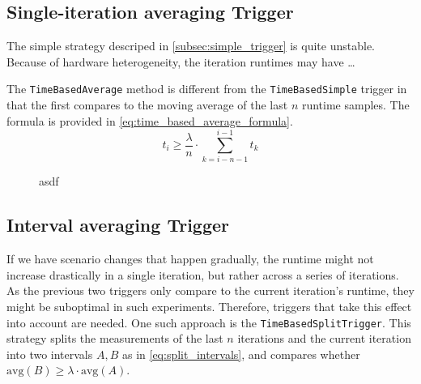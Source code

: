 \subsection{Single-iteration averaging Trigger}
The simple strategy descriped in \autoref{subsec:simple_trigger} is quite unstable. Because of hardware heterogeneity, the iteration runtimes may have …\textellipsis %

The \texttt{TimeBasedAverage} method is different from the \texttt{TimeBasedSimple} trigger in that the first compares to the  moving average of the last $n$ runtime samples. The formula is provided in \eqref{eq:time_based_average_formula}. 
\begin{equation}
	t_i \ge \frac{\lambda}{n}\cdot \sum_{k=i-n-1}^{i-1}t_{k}\label{eq:time_based_average_formula}
\end{equation}

\begin{figure}[htpb]
	\centering
	\caption{asdf}
	\label{fig:simple_vs_averaging}
\end{figure}


\subsection{Interval averaging Trigger}
If we have scenario changes that happen gradually, the runtime might not increase drastically in a single iteration, but rather across a series of iterations. As the previous two triggers only compare to the current iteration's runtime, they might be suboptimal in such experiments. Therefore, triggers that take this effect into account are needed.
One such approach is the \texttt{TimeBasedSplitTrigger}.
This strategy splits the measurements of the last $n$ iterations and the current iteration into two intervals $A, B$ as in \eqref{eq:split_intervals}, and compares whether $\text{avg}(B)\ge \lambda\cdot \text{avg}(A)$.

